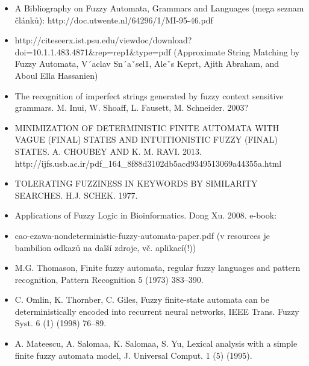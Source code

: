 \documentclass[a4paper,10pt]{article}
\begin{document}
\begin{itemize}
 \item A Bibliography on Fuzzy Automata, Grammars and Languages (mega seznam článků): http://doc.utwente.nl/64296/1/MI-95-46.pdf
 \item http://citeseerx.ist.psu.edu/viewdoc/download?doi=10.1.1.483.4871\&rep=rep1\&type=pdf (Approximate String Matching by Fuzzy
Automata, V´aclav Sn´aˇsel1, Aleˇs Keprt, Ajith Abraham, and Aboul Ella Hassanien)
 \item The recognition of imperfect strings generated by fuzzy context sensitive grammars. M. Inui, W. Shoaff, L. Fausett, M. Schneider. 2003?
 \item MINIMIZATION OF DETERMINISTIC FINITE AUTOMATA WITH VAGUE (FINAL) STATES AND INTUITIONISTIC FUZZY (FINAL) STATES. A. CHOUBEY AND K. M. RAVI. 2013. http://ijfs.usb.ac.ir/pdf\_164\_8f88d3102db5acd9349513069a44355a.html
 \item TOLERATING FUZZINESS IN KEYWORDS BY SIMILARITY SEARCHES. H.J. SCHEK. 1977. 
 \item Applications of Fuzzy Logic in Bioinformatics. Dong Xu. 2008. e-book: %
 \item cao-ezawa-nondeterministic-fuzzy-automata-paper.pdf (v resources je bambilion odkazů na další zdroje, vč. aplikací(!))
 \item M.G. Thomason, Finite fuzzy automata, regular fuzzy languages and pattern recognition, Pattern Recognition 5 (1973) 383–390.
 \item C. Omlin, K. Thornber, C. Giles, Fuzzy finite-state automata can be deterministically encoded into recurrent neural networks, IEEE Trans.
Fuzzy Syst. 6 (1) (1998) 76–89.
 \item A. Mateescu, A. Salomaa, K. Salomaa, S. Yu, Lexical analysis with a simple finite fuzzy automata model, J. Universal Comput. 1 (5) (1995). 
 
 \end{itemize}
\end{document}
